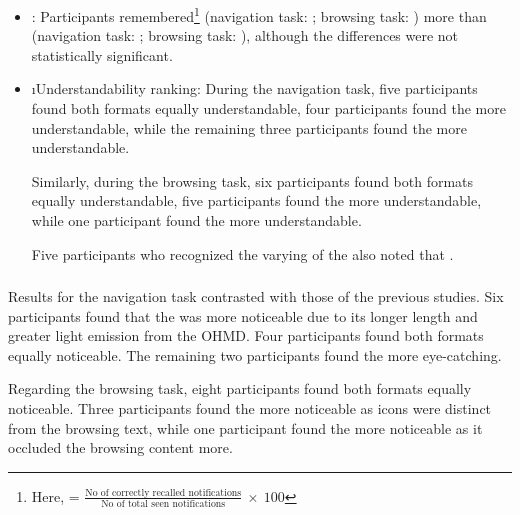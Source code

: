 \begin{itemize}
    \item \immediateRecall{}: Participants remembered\footnote{Here, \immediateRecall{} = $\frac{\text{No of correctly recalled notifications}}{\text{No of total seen notifications}} \: \times{} \: 100$}  (navigation task: ; browsing task: ) more than  (navigation task: ; browsing task: ), although the differences were not statistically significant.
    
    \item \i{Understandability ranking}: During the navigation task, five participants found both formats equally understandable, four participants found the \textformat{} more understandable, while the remaining three participants found the \iconformat{} more understandable.

    Similarly, during the browsing task, six participants found both formats equally understandable, five participants found the \textformat{} more understandable, while one participant found the \iconformat{} more understandable.

    Five participants who recognized the varying \complexity{} of the \textformat{} also noted that .
\end{itemize}



\subsubsection*{\Reaction{}}
\label{sec:IconNotif:study4:reaction_parameter}

Results for the navigation task contrasted with those of the previous studies. Six participants found that the \textformat{} was more noticeable due to its longer length and greater light emission from the OHMD. Four participants found both formats equally noticeable. The remaining two participants found the \iconformat{} more eye-catching.

Regarding the browsing task, eight participants found both formats equally noticeable. Three participants found the \iconformat{} more noticeable as icons were distinct from the browsing text, while one participant found the \textformat{} more noticeable as it occluded the browsing content more.

